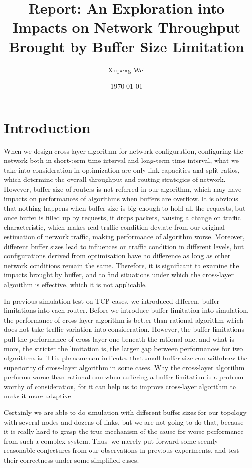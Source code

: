 \documentclass[a4paper]{article}
\title{Report: An Exploration into Impacts on Network Throughput Brought by Buffer Size Limitation}
\author{Xupeng Wei}
\date{\today}
\begin{document}
\maketitle


\section{Introduction}
\label{sec:introduction}

When we design cross-layer algorithm for network configuration, configuring the network both in short-term time interval and long-term time interval, what we take into consideration in optimization are only link capacities and split ratios, which determine the overall throughput and routing strategies of network. However, buffer size of routers is not referred in our algorithm, which may have impacts on performances of algorithms when buffers are overflow. It is obvious that nothing happens when buffer size is big enough to hold all the requests, but once buffer is filled up by requests, it drops packets, causing a change on traffic characteristic, which makes real traffic condition deviate from our original estimation of network traffic, making performance of algorithm worse. Moreover, different buffer sizes lead to influences on traffic condition in different levels, but configurations derived from optimization have no difference as long as other network conditions remain the same. Therefore, it is significant to examine the impacts brought by buffer, and to find situations under which the cross-layer algorithm is effective, which it is not applicable.

In previous simulation test on TCP cases, we introduced different buffer limitations into each router. Before we introduce buffer limitation into simulation, the performance of cross-layer algorithm is better than rational algorithm which does not take traffic variation into consideration. However, the buffer limitations pull the performance of cross-layer one beneath the rational one, and what is more, the stricter the limitation is, the larger gap between performances for two algorithms is.  This phenomenon indicates that small buffer size can withdraw the superiority of cross-layer algorithm in some cases. Why the cross-layer algorithm performs worse than rational one when suffering a buffer limitation is a problem worthy of consideration, for it can help us to improve cross-layer algorithm to make it more adaptive.
	
Certainly we are able to do simulation with different buffer sizes for our topology with several nodes and dozens of links, but we are not going to do that, because it is really hard to grasp the true mechanism of the cause for worse performance from such a complex system. Thus, we merely put forward some seemly reasonable conjectures from our observations in previous experiments, and test their correctness under some simplified cases.
\end{document}
